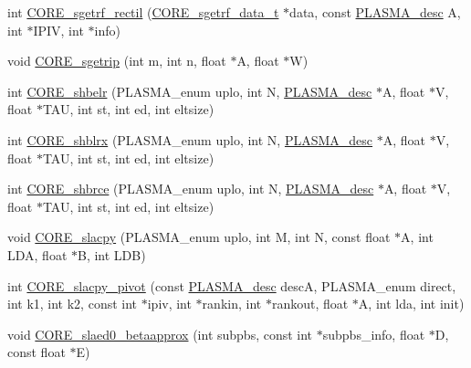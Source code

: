 \begin{DoxyCompactItemize}
\item 
int \hyperlink{group__CORE__float_ga1ca9b4f02be1908e96d1c6f478d66e29_ga1ca9b4f02be1908e96d1c6f478d66e29}{C\+O\+R\+E\+\_\+sgetrf\+\_\+rectil} (\hyperlink{structCORE__sgetrf__data__s}{C\+O\+R\+E\+\_\+sgetrf\+\_\+data\+\_\+t} $\ast$data, const \hyperlink{structplasma__desc__t}{P\+L\+A\+S\+M\+A\+\_\+desc} A, int $\ast$I\+P\+I\+V, int $\ast$info)
\item 
void \hyperlink{group__CORE__float_ga3da121622e3055a26b87b19bca0de6b1_ga3da121622e3055a26b87b19bca0de6b1}{C\+O\+R\+E\+\_\+sgetrip} (int m, int n, float $\ast$A, float $\ast$W)
\item 
int \hyperlink{group__CORE__float_gad9b6c185282ec9f915524680380f2f7f_gad9b6c185282ec9f915524680380f2f7f}{C\+O\+R\+E\+\_\+shbelr} (P\+L\+A\+S\+M\+A\+\_\+enum uplo, int N, \hyperlink{structplasma__desc__t}{P\+L\+A\+S\+M\+A\+\_\+desc} $\ast$A, float $\ast$V, float $\ast$T\+A\+U, int st, int ed, int eltsize)
\item 
int \hyperlink{group__CORE__float_gaf87eadfd8789a2e3c03d8c67e2d329c0_gaf87eadfd8789a2e3c03d8c67e2d329c0}{C\+O\+R\+E\+\_\+shblrx} (P\+L\+A\+S\+M\+A\+\_\+enum uplo, int N, \hyperlink{structplasma__desc__t}{P\+L\+A\+S\+M\+A\+\_\+desc} $\ast$A, float $\ast$V, float $\ast$T\+A\+U, int st, int ed, int eltsize)
\item 
int \hyperlink{group__CORE__float_ga1e9a35c1d158a814e3d4354f4cb46064_ga1e9a35c1d158a814e3d4354f4cb46064}{C\+O\+R\+E\+\_\+shbrce} (P\+L\+A\+S\+M\+A\+\_\+enum uplo, int N, \hyperlink{structplasma__desc__t}{P\+L\+A\+S\+M\+A\+\_\+desc} $\ast$A, float $\ast$V, float $\ast$T\+A\+U, int st, int ed, int eltsize)
\item 
void \hyperlink{group__CORE__float_gad97acc4cb699842f9baf0f6de7d5ba85_gad97acc4cb699842f9baf0f6de7d5ba85}{C\+O\+R\+E\+\_\+slacpy} (P\+L\+A\+S\+M\+A\+\_\+enum uplo, int M, int N, const float $\ast$A, int L\+D\+A, float $\ast$B, int L\+D\+B)
\item 
int \hyperlink{group__CORE__float_gac1585efc7bd8852d2747ae12d15afad7_gac1585efc7bd8852d2747ae12d15afad7}{C\+O\+R\+E\+\_\+slacpy\+\_\+pivot} (const \hyperlink{structplasma__desc__t}{P\+L\+A\+S\+M\+A\+\_\+desc} desc\+A, P\+L\+A\+S\+M\+A\+\_\+enum direct, int k1, int k2, const int $\ast$ipiv, int $\ast$rankin, int $\ast$rankout, float $\ast$A, int lda, int init)
\item 
void \hyperlink{group__CORE__float_ga2a582c11e8ea7f5b4c2e49fd27708b67_ga2a582c11e8ea7f5b4c2e49fd27708b67}{C\+O\+R\+E\+\_\+slaed0\+\_\+betaapprox} (int subpbs, const int $\ast$subpbs\+\_\+info, float $\ast$D, const float $\ast$E)

\end{DoxyCompactItemize}
